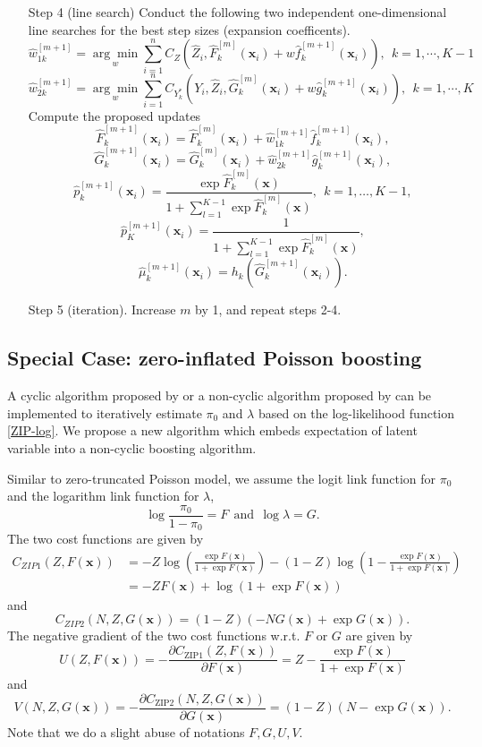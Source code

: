 \documentclass[11pt]{article}
\numberwithin{equation}{section}
\def\bx{\boldsymbol{x}}
\begin{document}
\begin{itemize}
\begin{itemize}
	\end{itemize}
	\item[Step 4] (line search) Conduct the following two independent one-dimensional line searches for the best step sizes (expansion coefficents).
	$$\hat{w}_{1k}^{[m+1]}=\underset{w}{\arg\min}\sum_{i=1}^n C_{Z}(\hat{Z}_i,\hat{F}_k^{[m]}(\bx_i)+w\hat{f}_{k}^{[m+1]}(\bx_i)),~~k=1,\cdots,K-1$$
	$$\hat{w}_{2k}^{[m+1]}=\underset{w}{\arg\min}\sum_{i=1}^n C_{Y_k^*}(Y_i,\hat{Z}_i,\hat{G}_k^{[m]}(\bx_i)+w\hat{g}_k^{[m+1]}(\bx_i)),~~k=1,\cdots,K$$
	Compute the proposed updates
	$$\hat{F}_k^{[m+1]}(\bx_i)=\hat{F}_k^{[m]}(\bx_i)+\hat{w}_{1k}^{[m+1]}\hat{f}_{k}^{[m+1]}(\bx_i),$$
	$$\hat{G}_k^{[m+1]}(\bx_i)=\hat{G}_k^{[m]}(\bx_i)+\hat{w}_{2k}^{[m+1]}\hat{g}_{k}^{[m+1]}(\bx_i),$$
	$$\hat{p}_k^{[m+1]}(\bx_i)=\frac{\exp{\hat{F}_k^{[m]}(\bx)}}{1+\sum_{l=1}^{K-1}\exp{\hat{F}_k^{[m]}(\bx)}},~~k=1,\dots,K-1,$$
	$$\hat{p}_{K}^{[m+1]}(\bx_i)=\frac{1}{1+\sum_{l=1}^{K-1}\exp{\hat{F}_k^{[m]}(\bx)}},$$
	$$\hat{\mu}_k^{[m+1]}(\bx_i)=h_k(\hat{G}_k^{[m+1]}(\bx_i)).$$ 
	\item[Step 5] (iteration). Increase $m$ by 1, and repeat steps 2-4.
\end{itemize}

\subsection{Special Case: zero-inflated Poisson boosting}

A cyclic algorithm proposed by \cite{mayr:2012} or a non-cyclic algorithm proposed by \cite{thomas:2018} can be implemented to iteratively estimate $\pi_0$ and $\lambda$ based on the log-likelihood function \eqref{ZIP-log}. 
We propose a new algorithm which embeds expectation of latent variable into a non-cyclic boosting algorithm.

Similar to zero-truncated Poisson model, we assume the logit link function for $\pi_0$ and the logarithm link function for $\lambda$,
$$\log \frac{\pi_0}{1-\pi_0}=F~~\text{and}~~ \log\lambda=G.$$
The two cost functions are given by 
\begin{equation*}
	\begin{aligned}
			C_{ZIP1}(Z,F(\bx))&=-Z\log\left(\frac{\exp F(\bx)}{1+\exp F(\bx)}\right)-(1-Z)\log\left(1-\frac{\exp F(\bx)}{1+\exp F(\bx)}\right)\\
		&=-ZF(\bx)+\log\left(1+\exp F(\bx)\right)
	\end{aligned}
\end{equation*}
and 
$$C_{ZIP2}(N,Z,G(\bx))=(1-Z)\left(-NG(\bx)+\exp G(\bx)\right).$$
The negative gradient of the two cost functions w.r.t. $F$ or $G$ are given by
\begin{equation}
	U(Z,F(\bx))=-\frac{\partial C_\text{ZIP1}(Z,F(\bx))}{\partial F(\bx)}=
	Z-\frac{\exp F(\bx)}{1+\exp F(\bx)}
\end{equation}
and
$$V(N,Z,G(\bx))=-\frac{\partial C_\text{ZIP2}(N,Z,G(\bx))}{\partial G(\bx)}=(1-Z)(N-\exp G(\bx)).$$  
Note that we do a slight abuse of notations $F,G,U,V$.
\end{document}
